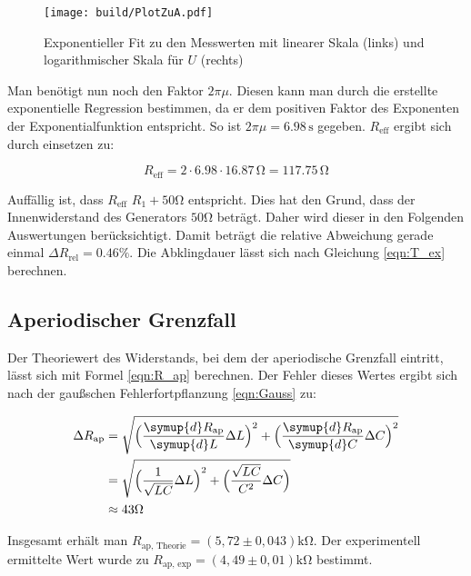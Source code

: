 \begin{figure}
  \centering
  \texttt{[image: build/PlotZuA.pdf]}
  \caption{Exponentieller Fit \cite{scipy} zu den Messwerten mit linearer Skala (links) und logarithmischer Skala für $U$ (rechts)}
  \label{fig:PlotZuA}
\end{figure}

Man benötigt nun noch den Faktor $2\pi\mu$. Diesen kann man durch die erstellte exponentielle Regression 
bestimmen, da er dem positiven Faktor des Exponenten der Exponentialfunktion entspricht. 
So ist $2\pi\mu = 6.98\,\unit{\second}$ gegeben.
$R_{\text{eff}}$ ergibt sich durch einsetzen zu:

\begin{equation*}
  R_{\text{eff}} = 2\cdot 6.98\cdot 16.87\,\unit{\ohm} = 117.75\,\unit{\ohm}
\end{equation*}

Auffällig ist, dass $R_{\text{eff}}$ \approx $R_1 + 50\unit{\ohm}$ entspricht. Dies hat den Grund, dass der Innenwiderstand des Generators
$50 \unit{\ohm}$ beträgt. Daher wird dieser in den Folgenden Auswertungen berücksichtigt. Damit beträgt die relative Abweichung gerade einmal $\Delta R_{\text{rel}} = 0.46\%$.
Die Abklingdauer lässt sich nach Gleichung \eqref{eqn:T_ex} berechnen.

\subsection{Aperiodischer Grenzfall}
\label{subsec:AuswertungB}

Der Theoriewert des Widerstands, bei dem der aperiodische Grenzfall eintritt, lässt sich mit Formel \eqref{eqn:R_ap} berechnen.
Der Fehler dieses Wertes ergibt sich nach der gaußschen Fehlerfortpflanzung \eqref{eqn:Gauss} zu:

\begin{align*}
  \label{eqn:err_R_ap}
  \Delta R_{\text{ap}} &= \sqrt{\Bigl(\frac{\symup{d}R_{\text{ap}}}{\symup{d}L}\Delta L \Bigr)^2+\Bigl(\frac{\symup{d}R_{\text{ap}}}{\symup{d}C}\Delta C\Bigr)^2} \\
  &= \sqrt{\Bigl(\frac{1}{\sqrt{LC}}\Delta L\Bigr)^2+\Bigl(\frac{\sqrt{LC}}{C^2}\Delta C\Bigr)} \\
  &\approx 43 \unit{\ohm}
\end{align*}

Insgesamt erhält man $R_{\text{ap, Theorie}} = (5,72 \pm 0,043) \unit{\kilo\ohm}$. Der experimentell ermittelte Wert wurde 
zu $R_{\text{ap, exp}} = (4,49 \pm 0,01) \unit{\kilo\ohm}$ bestimmt.

